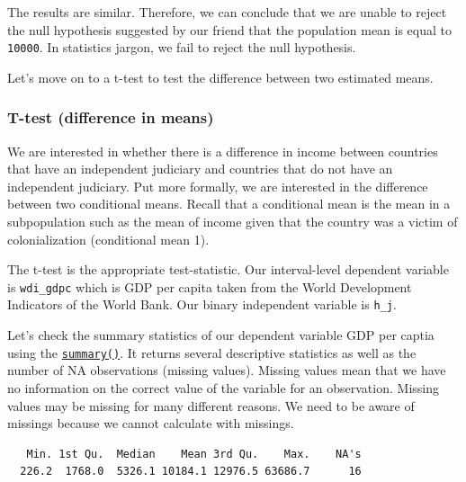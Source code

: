 \documentclass[]{article}
\newenvironment{Shaded}{\begin{snugshade}}{\end{snugshade}}
\newcommand{\KeywordTok}[1]{\textcolor[rgb]{0.13,0.29,0.53}{\textbf{#1}}}
\newcommand{\NormalTok}[1]{#1}
\newcommand{\OperatorTok}[1]{\textcolor[rgb]{0.81,0.36,0.00}{\textbf{#1}}}
\begin{document}
The results are similar. Therefore, we can conclude that we are unable to reject the null hypothesis suggested by our friend that the population mean is equal to \texttt{10000}. In statistics jargon, we fail to reject the null hypothesis.

Let's move on to a t-test to test the difference between two estimated means.

\hypertarget{t-test-difference-in-means}{%
\subsubsection{T-test (difference in means)}\label{t-test-difference-in-means}}

We are interested in whether there is a difference in income between countries that have an independent judiciary and countries that do not have an independent judiciary. Put more formally, we are interested in the difference between two conditional means. Recall that a conditional mean is the mean in a subpopulation such as the mean of income given that the country was a victim of colonialization (conditional mean 1).

The t-test is the appropriate test-statistic. Our interval-level dependent variable is \texttt{wdi\_gdpc} which is GDP per capita taken from the World Development Indicators of the World Bank. Our binary independent variable is \texttt{h\_j}.

Let's check the summary statistics of our dependent variable GDP per captia using the \href{https://www.rdocumentation.org/packages/base/versions/3.4.1/topics/summary}{\texttt{summary()}}. It returns several descriptive statistics as well as the number of NA observations (missing values). Missing values mean that we have no information on the correct value of the variable for an observation. Missing values may be missing for many different reasons. We need to be aware of missings because we cannot calculate with missings.

\begin{Shaded}
\end{Shaded}

\begin{verbatim}
   Min. 1st Qu.  Median    Mean 3rd Qu.    Max.    NA's 
  226.2  1768.0  5326.1 10184.1 12976.5 63686.7      16 
\end{verbatim}
\end{document}
